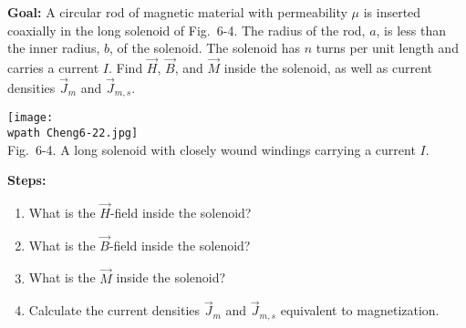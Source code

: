 \documentclass[../../header.tex]{subfiles}
\begin{document}
\textbf{Goal:} A circular rod of magnetic material with permeability $\mu$ is inserted coaxially in the long solenoid of Fig.~6-4. The radius of the rod, $a$, is less than the inner radius, $b$, of the solenoid. The solenoid has $n$ turns per unit length and carries a current $I$. Find $\vec{H}$, $\vec{B}$, and $\vec{M}$ inside the solenoid, as well as current densities $\vec{J}_m$ and $\vec{J}_{m,s}$.
\begin{center}
\texttt{[image: \\wpath Cheng6-22.jpg]}\\
Fig.~6-4. A long solenoid with closely wound windings carrying a current $I$.
\end{center}
\textbf{Steps:} 
\begin{enumerate}
\item What is the $\vec{H}$-field inside the solenoid?\\

\item What is the $\vec{B}$-field inside the solenoid?\\

\item What is the $\vec{M}$ inside the solenoid?\\

\item Calculate the current densities $\vec{J}_m$ and $\vec{J}_{m,s}$ equivalent to magnetization.\\
\end{enumerate}
\end{document}
